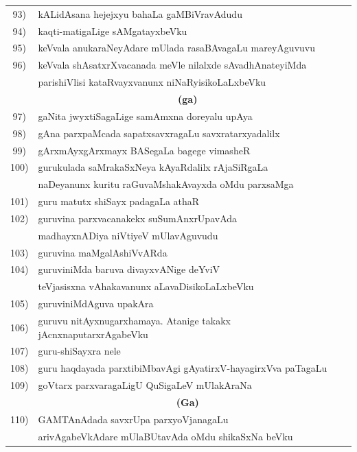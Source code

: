 {\begin{longtable}{@{}cp{7.4cm}r}
93) & kALidAsana hejejxyu bahaLa gaMBiVravAdudu & \pageref{page243}\\
94) & kaqti-matigaLige sAMgatayxbeVku & \pageref{page123}\\
95) & keVvala anukaraNeyAdare mUlada rasaBAvagaLu mareyAguvuvu & \pageref{page141}\\
96) & keVvala shAsatxrXvacanada meVle nilalxde sAvadhAnateyiMda & \\
    & parishiVlisi kataRvayxvanunx niNaRyisikoLaLxbeVku & \pageref{page253}\\[0.3cm]
    & \multicolumn{1}{c}{\textbf{(ga)}} & \\[0.3cm]
97) & gaNita jwyxtiSagaLige samAmxna doreyalu upAya & \pageref{page51}\\
98) & gAna parxpaMcada sapatxsavxragaLu savxratarxyadalilx & \pageref{page121}\\
99) & gArxmAyxgArxmayx BASegaLa bagege vimasheR & \pageref{page6a}\\
100) & gurukulada saMrakaSxNeya kAyaRdalilx rAjaSiRgaLa & \\
     & naDeyanunx kuritu raGuvaMshakAvayxda oMdu parxsaMga & \pageref{page232}\\
101) & guru matutx shiSayx padagaLa athaR & \pageref{page190}\\ 
102) & guruvina parxvacanakekx suSumAnxrUpavAda & \\
     & madhayxnADiya niVtiyeV mUlavAguvudu & \pageref{page101}\\
103) & guruvina maMgalAshiVvARda & \pageref{page75}\\
104) & guruviniMda baruva divayxvANige deYviV & \\
     & teVjasisxna vAhakavanunx aLavaDisikoLaLxbeVku & \pageref{page79}\\
105) & guruviniMdAguva upakAra & \pageref{page91}\\
106) & guruvu nitAyxnugarxhamaya. Atanige takakx jAcnxnaputarxrAgabeVku & \pageref{page74}\\
107) & guru-shiSayxra nele & \pageref{page66}\\
108) & guru haqdayada parxtibiMbavAgi gAyatirxV-hayagirxVva paTa\-gaLu & \pageref{page76}\\
109) & goVtarx parxvaragaLigU QuSigaLeV mUlakAraNa & \pageref{page139}\\[0.3cm]
     & \multicolumn{1}{c}{\textbf{(Ga)}} & \\[0.3cm]
110) &  GAMTAnAdada savxrUpa parxyoVjanagaLu & \\
     &  arivAgabeVkAdare mUlaBUtavAda oMdu shikaSxNa beVku &  \pageref{page169}\\

\end{longtable}}

